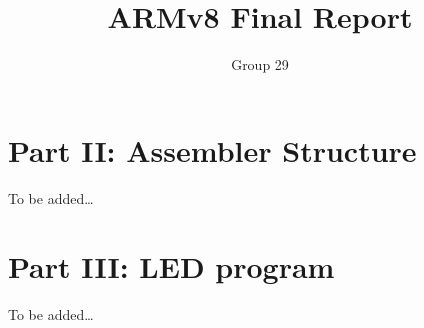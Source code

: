 \documentclass[11pt]{article}
\begin{document}
\title{ARMv8 Final Report}
\author{Group 29}

\maketitle

\section{Part II: Assembler Structure}

To be added\dots

\section{Part III: LED program}

To be added\dots
\end{document}
